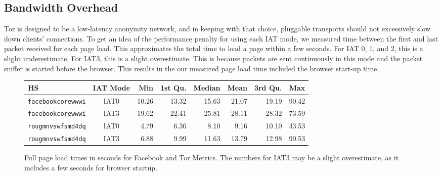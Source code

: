 \documentclass[11pt]{article}
\begin{document}
\subsection{Bandwidth Overhead}
Tor is designed to be a low-latency anonymity network, and in keeping with that choice, pluggable transports should not excessively slow down clients' connections. To get an idea of the performance penalty for using each IAT mode, we measured time between the first and last packet received for each page load. This approximates the total time to load a page within a few seconds. For IAT 0, 1, and 2, this is a slight underestimate. For IAT3, this is a slight overestimate. This is because packets are sent continuously in this mode and the packet sniffer is started before the browser. This results in the our measured page load time included the browser start-up time.
\begin{figure}[h]
    \centering
    \begin{tabular}{|l|c||r|r|r|r|r|r|}
        \hline
        HS & IAT Mode & Min & 1st Qu. & Median & Mean & 3rd Qu. & Max \\
        \hline
        \texttt{facebookcorewwwi} & IAT0 & 10.26 & 13.32 & 15.63 & 21.07 & 19.19 & 90.42 \\
        \texttt{facebookcorewwwi} & IAT3 & 19.62 & 22.41 & 25.81 & 28.11 & 28.32 & 73.59 \\
        \texttt{rougmnvswfsmd4dq} & IAT0 & 4.79 & 6.36 & 8.10 & 9.16 & 10.10 & 43.53 \\
        \texttt{rougmnvswfsmd4dq} & IAT3 & 6.88 & 9.99 & 11.63 & 13.79 & 12.98 & 90.53 \\
        \hline
    \end{tabular}
    \caption[]{Full page load times in seconds for Facebook and Tor Metrics. The numbers for IAT3 may be a slight overestimate, as it includes a few seconds for browser startup.}
\end{figure}
\end{document}
